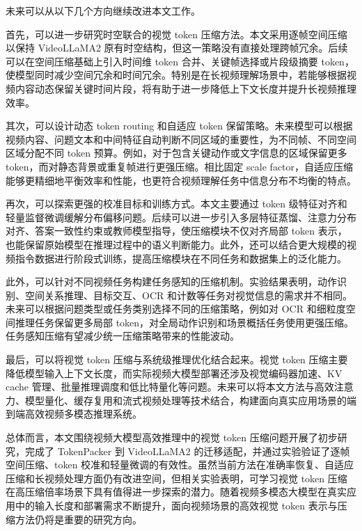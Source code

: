未来可以从以下几个方向继续改进本文工作。

首先，可以进一步研究时空联合的视觉 token 压缩方法。本文采用逐帧空间压缩以保持 VideoLLaMA2 原有时空结构，但这一策略没有直接处理跨帧冗余。后续可以在空间压缩基础上引入时间维 token 合并、关键帧选择或片段级摘要 token，使模型同时减少空间冗余和时间冗余。特别是在长视频理解场景中，若能够根据视频内容动态保留关键时间片段，将有助于进一步降低上下文长度并提升长视频推理效率。

其次，可以设计动态 token routing 和自适应 token 保留策略。未来模型可以根据视频内容、问题文本和中间特征自动判断不同区域的重要性，为不同帧、不同空间区域分配不同 token 预算。例如，对于包含关键动作或文字信息的区域保留更多 token，而对静态背景或重复帧进行更强压缩。相比固定 scale factor，自适应压缩能够更精细地平衡效率和性能，也更符合视频理解任务中信息分布不均衡的特点。

再次，可以探索更强的校准目标和训练方式。本文主要通过 token 级特征对齐和轻量监督微调缓解分布偏移问题。后续可以进一步引入多层特征蒸馏、注意力分布对齐、答案一致性约束或教师模型指导，使压缩模块不仅对齐局部 token 表示，也能保留原始模型在推理过程中的语义判断能力。此外，还可以结合更大规模的视频指令数据进行阶段式训练，提高压缩模块在不同任务和数据集上的泛化能力。

此外，可以针对不同视频任务构建任务感知的压缩机制。实验结果表明，动作识别、空间关系推理、目标交互、OCR 和计数等任务对视觉信息的需求并不相同。未来可以根据问题类型或任务类别选择不同的压缩策略，例如对 OCR 和细粒度空间推理任务保留更多局部 token，对全局动作识别和场景概括任务使用更强压缩。任务感知压缩有望减少统一压缩策略带来的性能波动。

最后，可以将视觉 token 压缩与系统级推理优化结合起来。视觉 token 压缩主要降低模型输入上下文长度，而实际视频大模型部署还涉及视觉编码器加速、KV cache 管理、批量推理调度和低比特量化等问题。未来可以将本文方法与高效注意力、模型量化、缓存复用和流式视频处理等技术结合，构建面向真实应用场景的端到端高效视频多模态推理系统。

总体而言，本文围绕视频大模型高效推理中的视觉 token 压缩问题开展了初步研究，完成了 TokenPacker 到 VideoLLaMA2 的迁移适配，并通过实验验证了逐帧空间压缩、token 校准和轻量微调的有效性。虽然当前方法在准确率恢复、自适应压缩和长视频处理方面仍有改进空间，但相关实验表明，可学习视觉 token 压缩在高压缩倍率场景下具有值得进一步探索的潜力。随着视频多模态大模型在真实应用中的输入长度和部署需求不断提升，面向视频场景的高效视觉 token 表示与压缩方法仍将是重要的研究方向。
